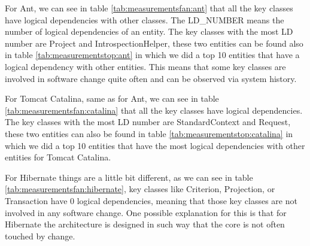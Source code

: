\documentclass[12pt]{mitthesis}
\begin{document}
For Ant, we can see in table \ref{tab:measurementsfan:ant} that all the key classes have logical dependencies with other classes. The LD\_NUMBER means the number of logical dependencies of an entity. The key classes with the most LD number are Project and IntrospectionHelper, these two entities can be found also in table \ref{tab:measurementstop:ant} in which we did a top 10 entities that have a logical dependency with other entities. This means that some key classes are involved in software change quite often and can be observed via system history.

\begin{table}[!h]
\renewcommand{\arraystretch}{1}
\caption{Measurements for Ant key classes}
\label{tab:measurementsfan:ant}
\centering
{}
\end{table}


For Tomcat Catalina, same as for Ant, we can see in table \ref{tab:measurementsfan:catalina} that all the key classes have logical dependencies.  The key classes with the most LD number are StandardContext and Request, these two entities can also be found in table \ref{tab:measurementstop:catalina} in which we did a top 10 entities that have the most logical dependencies with other entities for Tomcat Catalina.

For Hibernate things are a little bit different, as we can see in table \ref{tab:measurementsfan:hibernate},  key classes like Criterion, Projection, or Transaction have 0 logical dependencies, meaning that those key classes are not involved in any software change. One possible explanation for this is that for Hibernate the architecture is designed in such way that the core is not often touched by change. 
\end{document}

